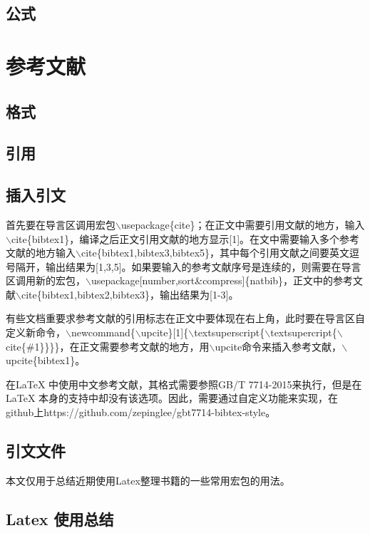 \documentclass[cn,10pt,math=newtx,citestyle=gb7714-2015,bibstyle=gb7714-2015]{elegantbook}
\begin{document}
\section{公式}

\chapter{参考文献}

\section{格式}

\section{引用}

\section{插入引文}

首先要在导言区调用宏包$\backslash$usepackage\{cite\}；在正文中需要引用文献的地方，输入$\backslash$cite\{bibtex1\}，编译之后正文引用文献的地方显示[1]。在文中需要输入多个参考文献的地方输入$\backslash$cite\{bibtex1,bibtex3,bibtex5\}，其中每个引用文献之间要英文逗号隔开，输出结果为[1,3,5]。如果要输入的参考文献序号是连续的，则需要在导言区调用新的宏包，$\backslash$usepackage[number,sort\&compress]\{natbib\}，正文中的参考文献$\backslash$cite\{bibtex1,bibtex2,bibtex3\}，输出结果为[1-3]。

有些文档重要求参考文献的引用标志在正文中要体现在右上角，此时要在导言区自定义新命令，$\backslash$newcommand\{$\backslash$upcite\}[1]\{$\backslash$textsuperscript\{$\backslash$textsupercript\{$\backslash$cite\{\#1\}\}\}\}，在正文需要参考文献的地方，用$\backslash$upcite命令来插入参考文献，$\backslash$upcite\{bibtex1\}。


在LaTeX{} 中使用中文参考文献，其格式需要参照GB/T 7714-2015来执行，但是在LaTeX{} 本身的支持中却没有该选项。因此，需要通过自定义功能来实现，在github上https://github.com/zepinglee/gbt7714-bibtex-style。


\section{引文文件}

本文仅用于总结近期使用Latex整理书籍的一些常用宏包的用法。

\section*{Latex 使用总结}
\end{document}
